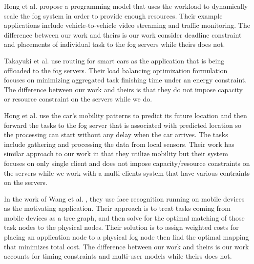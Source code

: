 Hong et al. \cite{smallfogcar} propose a programming model that uses the workload to dynamically scale the fog system in order to provide enough resources. Their example applications include vehicle-to-vehicle video streaming and traffic monitoring. The difference between our work and theirs is our work consider deadline constraint and placements of individual task to the fog servers while theirs does not.


Takayuki et al. \cite{serviceo} use routing for smart cars as the application that is being offloaded to the fog servers. Their load balancing optimization formulation focuses on minimizing aggregated task finishing time under an energy constraint. The difference between our work and theirs is that they do not impose capacity or resource constraint on the servers while we do. %


Hong et al. \cite{oppos} use the car's mobility patterns to predict its future location and then forward the tasks to the fog server that is associated with predicted location so the processing can start without any delay when the car arrives. The tasks include gathering and processing the data from local sensors. Their work has similar approach to our work in that they utilize mobility but their system focuses on only single client and does not impose capacity/resource constraints on the servers while we work with a multi-clients system that have various contraints on the servers. 



In the work of Wang et al. \cite{onlinep}, they use face recognition running on mobile devices as the motivating application. Their approach is to treat tasks coming from mobile devices as a tree graph, and then solve for the optimal matching of those task nodes to the physical nodes. Their solution is to assign weighted costs for placing an application node to a physical fog node then find the optimal mapping that minimizes total cost. The difference between our work and theirs is our work accounts for timing constraints and multi-user models while theirs does not.


